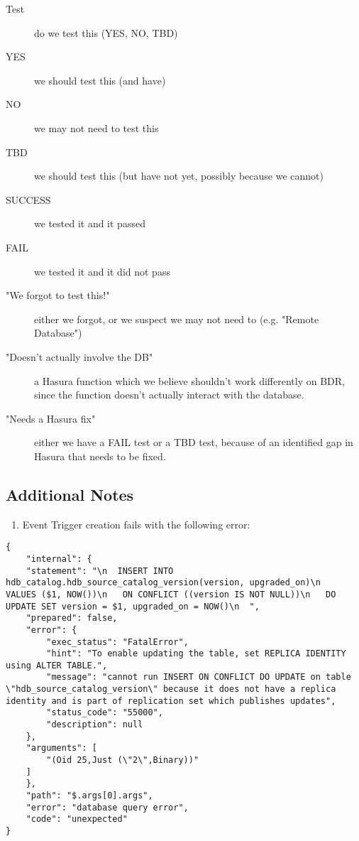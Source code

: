 \documentclass[11pt]{article}
\begin{document}
\begin{description}
\item[{Test}] do we test this (YES, NO, TBD)
\item[{YES}] we should test this (and have)
\item[{NO}] we may not need to test this
\item[{TBD}] we should test this (but have not yet, possibly because we
cannot)
\item[{SUCCESS}] we tested it and it passed
\item[{FAIL}] we tested it and it did not pass
\item[{"We forgot to test this!"}] either we forgot, or we suspect we may
not need to (e.g. "Remote Database")
\item[{"Doesn't actually involve the DB"}] a Hasura function which we
believe shouldn't work differently on BDR, since the function
doesn't actually interact with the database.
\item[{"Needs a Hasura fix"}] either we have a FAIL test or a TBD test,
because of an identified gap in Hasura that needs to be fixed.
\end{description}

\subsection{Additional Notes}
\label{sec:org088be7e}

\begin{enumerate}
\item Event Trigger creation fails with the following error:
\end{enumerate}

\begin{verbatim}
{
    "internal": {
	"statement": "\n  INSERT INTO hdb_catalog.hdb_source_catalog_version(version, upgraded_on)\n    VALUES ($1, NOW())\n   ON CONFLICT ((version IS NOT NULL))\n   DO UPDATE SET version = $1, upgraded_on = NOW()\n  ",
	"prepared": false,
	"error": {
	    "exec_status": "FatalError",
	    "hint": "To enable updating the table, set REPLICA IDENTITY using ALTER TABLE.",
	    "message": "cannot run INSERT ON CONFLICT DO UPDATE on table \"hdb_source_catalog_version\" because it does not have a replica identity and is part of replication set which publishes updates",
	    "status_code": "55000",
	    "description": null
	},
	"arguments": [
	    "(Oid 25,Just (\"2\",Binary))"
	]
    },
    "path": "$.args[0].args",
    "error": "database query error",
    "code": "unexpected"
}
\end{verbatim}
\end{document}
